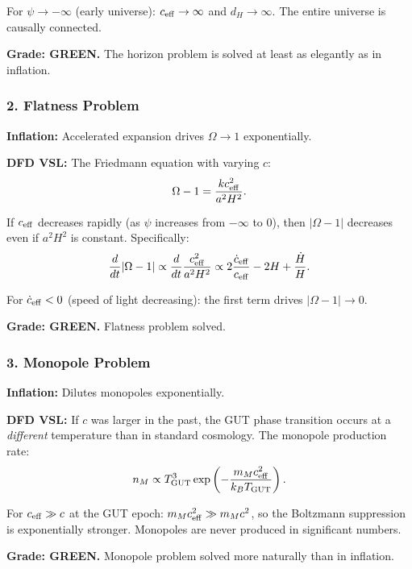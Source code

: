 \documentclass[11pt,a4paper]{article}
\newcommand{\GREEN}{\textcolor{dfdgreen}{\textbf{GREEN}}}
\begin{document}
For $\psi \to -\infty$ (early universe): $c_{\rm eff} \to \infty$ and $d_H \to \infty$. The entire universe is causally connected.

\textbf{Grade: \GREEN.} The horizon problem is solved at least as elegantly as in inflation.

\subsubsection{2. Flatness Problem}

\textbf{Inflation:} Accelerated expansion drives $\Omega \to 1$ exponentially.

\textbf{DFD VSL:} The Friedmann equation with varying $c$:
\begin{equation}
\Omega - 1 = \frac{kc_{\rm eff}^2}{a^2 H^2}.
\end{equation}

If $c_{\rm eff}$ decreases rapidly (as $\psi$ increases from $-\infty$ to 0), then $|\Omega - 1|$ decreases even if $a^2 H^2$ is constant. Specifically:
\begin{equation}
\frac{d}{dt}|\Omega - 1| \propto \frac{d}{dt}\frac{c_{\rm eff}^2}{a^2 H^2} \propto 2\frac{\dot c_{\rm eff}}{c_{\rm eff}} - 2H + \frac{\dot H}{H}.
\end{equation}

For $\dot c_{\rm eff} < 0$ (speed of light decreasing): the first term drives $|\Omega - 1| \to 0$.

\textbf{Grade: \GREEN.} Flatness problem solved.

\subsubsection{3. Monopole Problem}

\textbf{Inflation:} Dilutes monopoles exponentially.

\textbf{DFD VSL:} If $c$ was larger in the past, the GUT phase transition occurs at a \emph{different} temperature than in standard cosmology. The monopole production rate:
\begin{equation}
n_M \propto T_{\rm GUT}^3 \exp\left(-\frac{m_M c_{\rm eff}^2}{k_B T_{\rm GUT}}\right).
\end{equation}

For $c_{\rm eff} \gg c$ at the GUT epoch: $m_M c_{\rm eff}^2 \gg m_M c^2$, so the Boltzmann suppression is exponentially stronger. Monopoles are never produced in significant numbers.

\textbf{Grade: \GREEN.} Monopole problem solved more naturally than in inflation.
\end{document}
